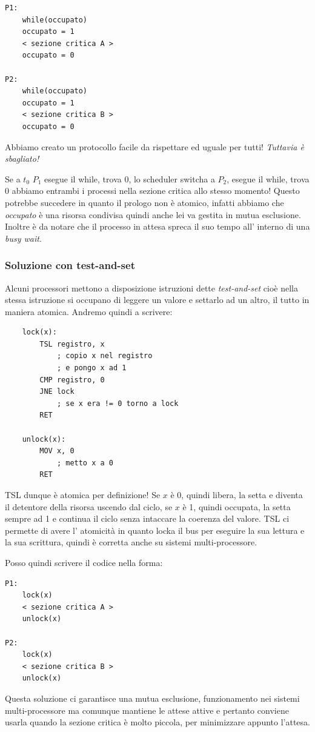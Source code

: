 \begin{verbatim}
P1:
    while(occupato)
    occupato = 1
    < sezione critica A >
    occupato = 0
    
P2:    
    while(occupato)
    occupato = 1
    < sezione critica B >
    occupato = 0
\end{verbatim}
Abbiamo creato un protocollo facile da rispettare ed uguale per tutti!
\emph{Tuttavia è sbagliato!}

Se a $t_0$ $P_1$ esegue il while, trova 0, lo scheduler switcha a $P_2$, esegue il while, trova 0 abbiamo entrambi i processi nella sezione critica allo stesso momento!
Questo potrebbe succedere in quanto il prologo non è atomico, infatti abbiamo che \emph{occupato} è una risorsa condivisa quindi anche lei va gestita in mutua esclusione.
Inoltre è da notare che il processo in attesa spreca il suo tempo all' interno di una \emph{busy wait}.

\subsubsection{Soluzione con test-and-set}
Alcuni processori mettono a disposizione istruzioni dette \emph{test-and-set} cioè nella stessa istruzione si occupano di leggere un valore e settarlo ad un altro, il tutto in maniera atomica.
Andremo quindi a scrivere:
\begin{verbatim}
    lock(x):
        TSL registro, x
            ; copio x nel registro
            ; e pongo x ad 1
        CMP registro, 0
        JNE lock
            ; se x era != 0 torno a lock
        RET
        
    unlock(x):
        MOV x, 0
            ; metto x a 0
        RET
\end{verbatim}
TSL dunque è atomica per definizione!
Se $x$ è 0, quindi libera, la setta e diventa il detentore della risorsa uscendo dal ciclo, se $x$ è 1, quindi occupata, la setta sempre ad 1 e continua il ciclo senza intaccare la coerenza del valore.
TSL ci permette di avere l' atomicità in quanto locka il bus per eseguire la sua lettura e la sua scrittura, quindi è corretta anche su sistemi multi-processore.

Posso quindi scrivere il codice nella forma:
\begin{verbatim}
P1:
    lock(x)
    < sezione critica A >
    unlock(x)

P2:    
    lock(x)
    < sezione critica B >
    unlock(x)
\end{verbatim}
Questa soluzione ci garantisce una mutua esclusione, funzionamento nei sistemi multi-processore ma comunque mantiene le attese attive e pertanto conviene usarla quando la sezione critica è molto piccola, per minimizzare appunto l'attesa.


